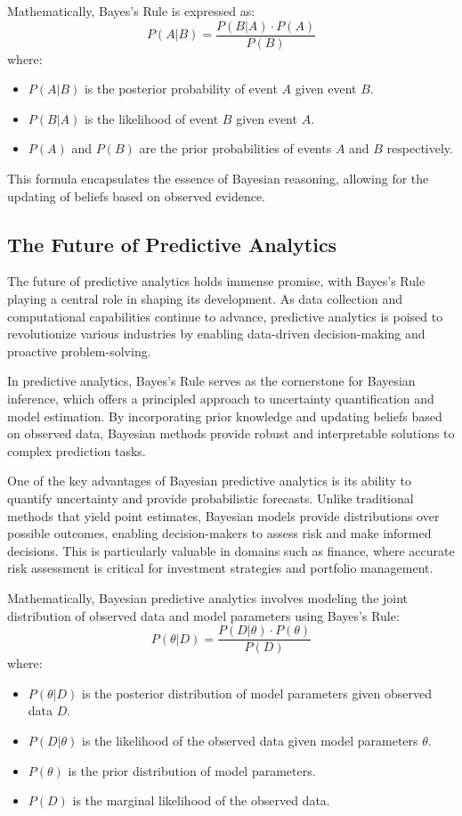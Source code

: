 \documentclass[12pt]{book} %
\begin{document}
Mathematically, Bayes's Rule is expressed as:
\begin{equation*}
    P(A|B) = \frac{P(B|A) \cdot P(A)}{P(B)}
\end{equation*}
where:
\begin{itemize}
    \item \(P(A|B)\) is the posterior probability of event \(A\) given event \(B\).
    \item \(P(B|A)\) is the likelihood of event \(B\) given event \(A\).
    \item \(P(A)\) and \(P(B)\) are the prior probabilities of events \(A\) and \(B\) respectively.
\end{itemize}

This formula encapsulates the essence of Bayesian reasoning, allowing for the updating of beliefs based on observed evidence.

\subsection{The Future of Predictive Analytics}
The future of predictive analytics holds immense promise, with Bayes's Rule playing a central role in shaping its development. As data collection and computational capabilities continue to advance, predictive analytics is poised to revolutionize various industries by enabling data-driven decision-making and proactive problem-solving.

In predictive analytics, Bayes's Rule serves as the cornerstone for Bayesian inference, which offers a principled approach to uncertainty quantification and model estimation. By incorporating prior knowledge and updating beliefs based on observed data, Bayesian methods provide robust and interpretable solutions to complex prediction tasks.

One of the key advantages of Bayesian predictive analytics is its ability to quantify uncertainty and provide probabilistic forecasts. Unlike traditional methods that yield point estimates, Bayesian models provide distributions over possible outcomes, enabling decision-makers to assess risk and make informed decisions. This is particularly valuable in domains such as finance, where accurate risk assessment is critical for investment strategies and portfolio management.

Mathematically, Bayesian predictive analytics involves modeling the joint distribution of observed data and model parameters using Bayes's Rule:
\begin{equation*}
    P(\theta|D) = \frac{P(D|\theta) \cdot P(\theta)}{P(D)}
\end{equation*}
where:
\begin{itemize}
    \item \(P(\theta|D)\) is the posterior distribution of model parameters given observed data \(D\).
    \item \(P(D|\theta)\) is the likelihood of the observed data given model parameters \(\theta\).
    \item \(P(\theta)\) is the prior distribution of model parameters.
    \item \(P(D)\) is the marginal likelihood of the observed data.
\end{itemize}
\end{document}
